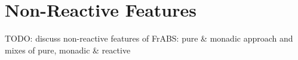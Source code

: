 \section{Non-Reactive Features}
TODO: discuss non-reactive features of FrABS: pure \& monadic approach and mixes of pure, monadic \& reactive